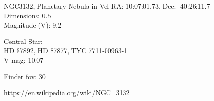 \begin{block}{NGC3132, Planetary Nebula in Vel}
    RA: 10:07:01.73, Dec: -40:26:11.7 \\ 
    Dimensions: 0.5 \\ 
    Magnitude (V): 9.2


    Central Star: \\ 
      \hspace{1em}HD 87892, HD 87877, TYC 7711-00963-1 \\ 
      \hspace{1em}V-mag: 10.07 


    Finder fov: 30 

    \url{https://en.wikipedia.org/wiki/NGC_3132} 
\end{block}
